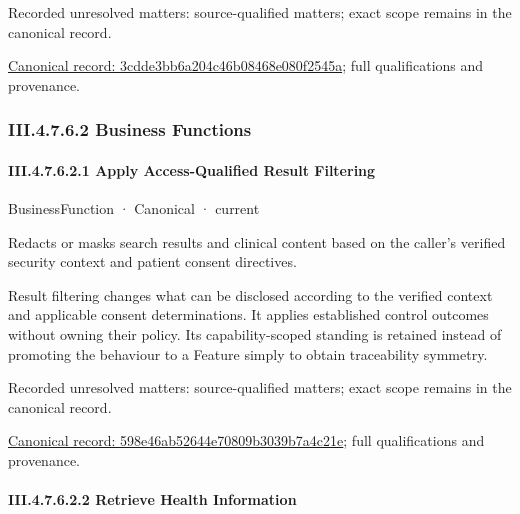 {\small Recorded unresolved matters: source-qualified matters; exact scope remains in the canonical record.}\par
{\footnotesize \href{../../../../../../../continuum/business/business-service/3cdde3bb6a204c46b08468e080f2545a.md}{Canonical record: 3cdde3bb6a204c46b08468e080f2545a}; full qualifications and provenance.}\par
\subsubsection*{III.4.7.6.2 Business Functions}
\label{navigation:III.4.7.6.2}

\paragraph*{III.4.7.6.2.1 Apply Access-Qualified Result Filtering}
\label{navigation:III.4.7.6.2.1}

\label{element:598e46ab52644e70809b3039b7a4c21e}
{\small BusinessFunction · Canonical · current}\par

Redacts or masks search results and clinical content based on the caller's verified security context and patient consent directives.



Result filtering changes what can be disclosed according to the verified context and applicable consent determinations. It applies established control outcomes without owning their policy. Its capability-scoped standing is retained instead of promoting the behaviour to a Feature simply to obtain traceability symmetry.


{\small Recorded unresolved matters: source-qualified matters; exact scope remains in the canonical record.}\par
{\footnotesize \href{../../../../../../../continuum/business/business-function/598e46ab52644e70809b3039b7a4c21e.md}{Canonical record: 598e46ab52644e70809b3039b7a4c21e}; full qualifications and provenance.}\par
\paragraph*{III.4.7.6.2.2 Retrieve Health Information}
\label{navigation:III.4.7.6.2.2}


